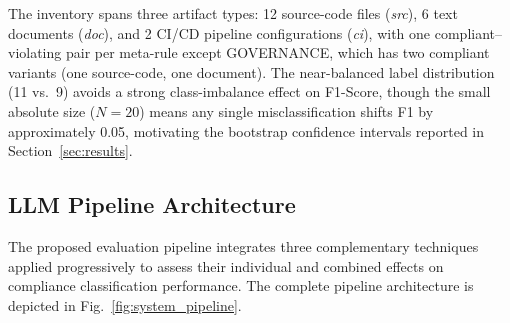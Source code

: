 \documentclass{ieeeaccess}
\begin{document}
The inventory spans three artifact types: 12 source-code files (\textit{src}), 6 text documents (\textit{doc}), and 2 CI/CD pipeline configurations (\textit{ci}), with one compliant--violating pair per meta-rule except GOVERNANCE, which has two compliant variants (one source-code, one document). The near-balanced label distribution (11 vs.\ 9) avoids a strong class-imbalance effect on F1-Score, though the small absolute size ($N=20$) means any single misclassification shifts F1 by approximately 0.05, motivating the bootstrap confidence intervals reported in Section~\ref{sec:results}.

\subsection{LLM Pipeline Architecture}
\label{sec:pipeline}

The proposed evaluation pipeline integrates three complementary techniques applied progressively to assess their individual and combined effects on compliance classification performance. The complete pipeline architecture is depicted in Fig.~\ref{fig:system_pipeline}.
\end{document}
